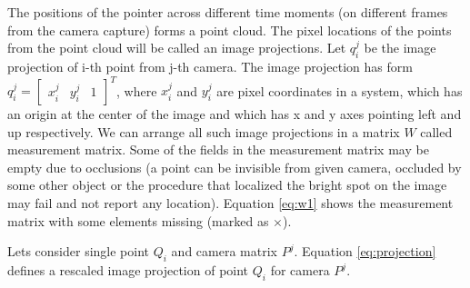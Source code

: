 \documentclass[12pt]{article}
\begin{document}
The positions of the pointer across different time moments (on different frames from the camera capture) forms a point cloud. The pixel locations of the points from the point cloud will be called an image projections. Let $q_i^j$ be the image projection of i-th point from j-th camera. The image projection has form $q_i^j = \begin{bmatrix} x_i^j & y_i^j & 1 \end{bmatrix}^T$, where $x_i^j$ and $y_i^j$ are pixel coordinates in a system, which has an origin at the center of the image and which has x and y axes pointing left and up respectively. We can arrange all such image projections in a matrix $W$ called measurement matrix. Some of the fields in the measurement matrix may be empty due to occlusions (a point can be invisible from given camera, occluded by some other object or the procedure that localized the bright spot on the image may fail and not report any location). Equation \ref{eq:w1} shows the measurement matrix with some elements missing (marked as $\times$).


Lets consider single point $Q_i$ and camera matrix $P^j$. Equation \ref{eq:projection} defines a rescaled image projection of point $Q_i$ for camera $P^j$.
\end{document}
